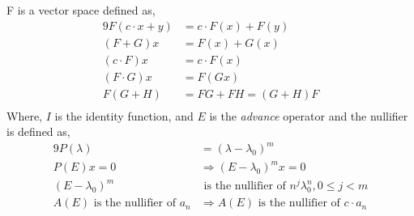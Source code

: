 \setcounter{MaxMatrixCols}{30}
\newtheorem{theorem}{Theorem}
\newtheorem{acknowledgement}[theorem]{Acknowledgement}
\newtheorem{algorithm}[theorem]{Algorithm}
\newtheorem{axiom}{Axiom}
\newtheorem{case}[theorem]{Case}
\newtheorem{claim}[theorem]{Claim}
\newtheorem{conclusion}[theorem]{Conclusion}
\newtheorem{condition}[theorem]{Condition}
\newtheorem{conjecture}[theorem]{Conjecture}
\newtheorem{corollary}[theorem]{Corollary}
\newtheorem{criterion}[theorem]{Criterion}
\newtheorem{definition}[theorem]{Definition}
\newtheorem{example}[theorem]{Example}
\newtheorem{exercise}[theorem]{Exercise}
\newtheorem{lemma}[theorem]{Lemma}
\newtheorem{notation}[theorem]{Notation}
\newtheorem{problem}[theorem]{Problem}
\newtheorem{proposition}[theorem]{Proposition}
\newtheorem{remark}[theorem]{Remark}
\newtheorem{solution}[theorem]{Solution}
\newtheorem{summary}[theorem]{Summary}
\newenvironment{proof}[1][Proof]{\textbf{#1.} }{\ \rule{0.5em}{0.5em}}

\newcommand{\Q}{\mathbb{Q}}
\newcommand{\R}{\mathbb{R}}
\newcommand{\C}{\mathbb{C}}
\newcommand{\Z}{\mathbb{Z}}


F is a vector space defined as,
\begin{alignat*}{9}
F(c\cdot x + y) &= c\cdot F(x) + F(y) \\
(F+G)x &= F(x) + G(x) \\
(c\cdot F)x &= c\cdot F(x) \\
(F\cdot G)x &= F(Gx) \\
F(G+H) &= FG + FH = (G+H)F\\
\end{alignat*}
Where, $I$ is the identity function, and $E$ is the \textit{advance} operator and the nullifier is defined as,
\begin{alignat*}{9}
P(\lambda) &= (\lambda - \lambda_0)^m \\
P(E)x = 0 &\Rightarrow (E-\lambda_0)^m x = 0 \\
(E-\lambda_0) ^m &\text{ is the nullifier of } n^j\lambda^n_0, 0\leq j < m \\
A(E) \text{ is the nullifier of } a_n &\Rightarrow A(E) \text{ is the nullifier of } c\cdot a_n
\end{alignat*}

